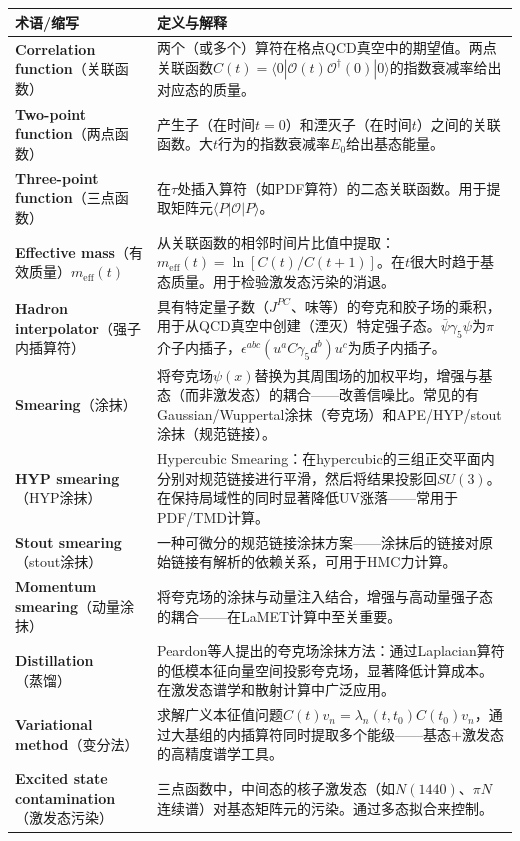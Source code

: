 \documentclass[12pt,a4paper]{ctexart}
\begin{document}
\begin{longtable}{p{3.5cm}p{9cm}}
\toprule
\textbf{术语/缩写} & \textbf{定义与解释} \\
\midrule
\endhead
\textbf{Correlation function}（关联函数）& 两个（或多个）算符在格点QCD真空中的期望值。两点关联函数$C(t) = \langle 0| \mathcal{O}(t) \mathcal{O}^\dagger(0) |0 \rangle$的指数衰减率给出对应态的质量。\\
\textbf{Two-point function}（两点函数）& 产生子（在时间$t=0$）和湮灭子（在时间$t$）之间的关联函数。大$t$行为的指数衰减率$E_0$给出基态能量。\\
\textbf{Three-point function}（三点函数）& 在$\tau$处插入算符（如PDF算符）的二态关联函数。用于提取矩阵元$\langle P|\mathcal{O}|P\rangle$。\\
\textbf{Effective mass}（有效质量）$m_{\text{eff}}(t)$& 从关联函数的相邻时间片比值中提取：$m_{\text{eff}}(t) = \ln[C(t)/C(t+1)]$。在$t$很大时趋于基态质量。用于检验激发态污染的消退。\\
\textbf{Hadron interpolator}（强子内插算符）& 具有特定量子数（$J^{PC}$、味等）的夸克和胶子场的乘积，用于从QCD真空中创建（湮灭）特定强子态。$\bar\psi\gamma_5\psi$为$\pi$介子内插子，$\epsilon^{abc}(u^a C\gamma_5 d^b) u^c$为质子内插子。\\
\textbf{Smearing}（涂抹）& 将夸克场$\psi(x)$替换为其周围场的加权平均，增强与基态（而非激发态）的耦合——改善信噪比。常见的有Gaussian/Wuppertal涂抹（夸克场）和APE/HYP/stout涂抹（规范链接）。\\
\textbf{HYP smearing}（HYP涂抹）& Hypercubic Smearing：在hypercubic的三组正交平面内分别对规范链接进行平滑，然后将结果投影回$SU(3)$。在保持局域性的同时显著降低UV涨落——常用于PDF/TMD计算。\\
\textbf{Stout smearing}（stout涂抹）& 一种可微分的规范链接涂抹方案——涂抹后的链接对原始链接有解析的依赖关系，可用于HMC力计算。\\
\textbf{Momentum smearing}（动量涂抹）& 将夸克场的涂抹与动量注入结合，增强与高动量强子态的耦合——在LaMET计算中至关重要。\\
\textbf{Distillation}（蒸馏）& Peardon等人提出的夸克场涂抹方法：通过Laplacian算符的低模本征向量空间投影夸克场，显著降低计算成本。在激发态谱学和散射计算中广泛应用。\\
\textbf{Variational method}（变分法）& 求解广义本征值问题$C(t)v_n = \lambda_n(t,t_0) C(t_0) v_n$，通过大基组的内插算符同时提取多个能级——基态+激发态的高精度谱学工具。\\
\textbf{Excited state contamination}（激发态污染）& 三点函数中，中间态的核子激发态（如$N(1440)$、$\pi N$连续谱）对基态矩阵元的污染。通过多态拟合来控制。\\
\bottomrule
\end{longtable}
\end{document}
